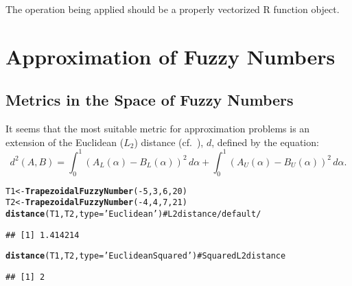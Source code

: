 \documentclass[11pt]{article}\usepackage{graphicx, color}
\makeatletter
\newcommand{\hlfunctioncall}[1]{\textcolor[rgb]{0.501960784313725,0,0.329411764705882}{\textbf{#1}}}%
\newcommand{\hlstring}[1]{\textcolor[rgb]{0.6,0.6,1}{#1}}%
\newcommand{\hlcomment}[1]{\textcolor[rgb]{0.180392156862745,0.6,0.341176470588235}{#1}}%
\newenvironment{kframe}{%
 \def\at@end@of@kframe{}%
 \ifinner\ifhmode%
  \def\at@end@of@kframe{\end{minipage}}%
  \begin{minipage}{\columnwidth}%
 \fi\fi%
 \def\FrameCommand##1{\hskip\@totalleftmargin \hskip-\fboxsep
 \colorbox{shadecolor}{##1}\hskip-\fboxsep
     \hskip-\linewidth \hskip-\@totalleftmargin \hskip\columnwidth}%
 \MakeFramed {\advance\hsize-\width
   \@totalleftmargin\z@ \linewidth\hsize
   \@setminipage}}%
 {\par\unskip\endMakeFramed%
 \at@end@of@kframe}
\newenvironment{knitrout}{}{} %
\newcommand{\lang}[1]{\textsf{#1}\xspace}
\newcommand{\R}{\lang{R}}
\makeatother
\begin{document}
\noindent
The operation being applied should be a properly
vectorized \R function object.









\section{Approximation of Fuzzy Numbers}\label{Sec:Approximation}


\subsection{Metrics in the Space of Fuzzy Numbers}

It seems that the most suitable metric for approximation problems
is an extension of the Euclidean ($L_2$) distance
(cf.~\cite{Grzegorzewski1998:metricsordersfn}), $d$, defined by the equation:
\begin{equation}
d^2(A,B) = \int_0^1 \left(A_L(\alpha)-B_L(\alpha)\right)^2\,d\alpha
         + \int_0^1 \left(A_U(\alpha)-B_U(\alpha)\right)^2\,d\alpha.
\end{equation}


\begin{knitrout}\small
{}\color{fgcolor}\begin{kframe}
\begin{alltt}
T1 <- \hlfunctioncall{TrapezoidalFuzzyNumber}(-5, 3, 6, 20)
T2 <- \hlfunctioncall{TrapezoidalFuzzyNumber}(-4, 4, 7, 21)
\hlfunctioncall{distance}(T1, T2, type=\hlstring{'Euclidean'}) \hlcomment{# L2 distance /default/}
\end{alltt}
\begin{verbatim}
## [1] 1.414214
\end{verbatim}
\begin{alltt}
\hlfunctioncall{distance}(T1, T2, type=\hlstring{'EuclideanSquared'}) \hlcomment{# Squared L2 distance}
\end{alltt}
\begin{verbatim}
## [1] 2
\end{verbatim}
\end{kframe}
\end{knitrout}
\end{document}

